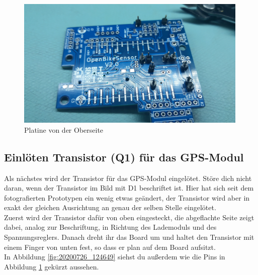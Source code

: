 \documentclass[12pt, a4paper]{article}		%
\begin{document}
\begin{figure}[H]
	\centering
		\includegraphics[width=0.99\textwidth]{Grafiken/20200726_123700.jpg}
	\caption{Platine von der Oberseite}
	\label{fig:20200726_123700}
\end{figure}

\subsection{Einlöten Transistor (Q1) für das GPS-Modul}

Als nächstes wird der Transistor für das GPS-Modul eingelötet. Störe dich nicht daran, wenn der Transistor im Bild mit D1 beschriftet ist. Hier hat sich seit dem fotografierten Prototypen ein wenig etwas geändert, der Transistor wird aber in exakt der gleichen Ausrichtung an genau der selben Stelle eingelötet. \\

Zuerst wird der Transistor dafür von oben eingesteckt, die abgeflachte Seite zeigt dabei, analog zur Beschriftung, in Richtung des Lademoduls und des Spannungsreglers. Danach dreht ihr das Board um und haltet den Transistor mit einem Finger von unten fest, so dass er plan auf dem Board aufsitzt.\\

In Abbildung \ref{fig:20200726_124649} siehst du außerdem wie die Pins in Abbildung \ref{fig:20200726_123700} gekürzt aussehen.
\end{document}
